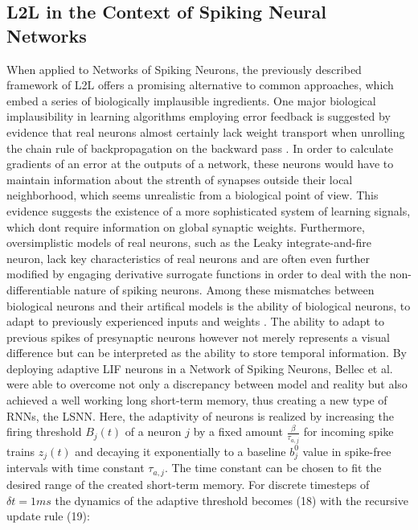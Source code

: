 \documentclass[letterpaper, 10 pt, conference]{ieeeconf}  %
\begin{document}
\subsection{L2L in the Context of Spiking Neural Networks}
When applied to Networks of Spiking Neurons, the previously described framework of L2L offers a promising alternative
to common approaches, which embed a series of biologically implausible ingredients. One major biological implausibility
in learning algorithms employing error feedback is suggested by evidence that real neurons almost certainly lack weight transport
when unrolling the chain rule of backpropagation on the backward pass\cite{samadiDeepLearningDynamic2017}
\cite{chintaAdaptiveOptimalControl2012}\cite{crickRecentExcitementNeural1989}. In order 
to calculate gradients
of an error at the outputs of a network, these neurons would have to maintain information about the strenth of synapses outside their local
neighborhood, which seems unrealistic from a biological point of view. This evidence suggests the existence of a more sophisticated 
system of learning signals, which dont require information on global synaptic weights. Furthermore, oversimplistic models of real
neurons, such as the Leaky integrate-and-fire neuron, lack key characteristics of real neurons and are often even further modified by engaging
derivative surrogate functions in order to deal with the non-differentiable nature of spiking neurons. Among these mismatches between 
biological neurons and their artifical models is the ability of biological neurons, to adapt to previously experienced inputs
and weights \cite{samadiDeepLearningDynamic2017}. The ability to adapt to previous spikes of presynaptic neurons however not merely represents a visual
difference but can be interpreted as the ability to store temporal information. \newline
By deploying adaptive LIF neurons in a Network of Spiking Neurons, Bellec et al.\cite{bellecLongShorttermMemory2018} were able to overcome not only a 
discrepancy between model and reality but also achieved a well working long short-term memory, thus creating a new type of RNNs, the LSNN. 
Here, the adaptivity of neurons is realized by increasing the firing threshold $B_j(t)$ of a neuron $j$
by a fixed amount $\frac{\beta}{\tau_{a,j}}$ for incoming spike trains $z_j(t)$ and decaying it exponentially to a baseline $b^0_j$ value in spike-free intervals 
with time constant $\tau_{a,j}$. The time constant can be chosen to fit the desired range of the created short-term memory. For discrete timesteps
of $\delta t = 1 ms$ the dynamics of the adaptive threshold becomes (18) with the recursive update rule (19):
\end{document}
